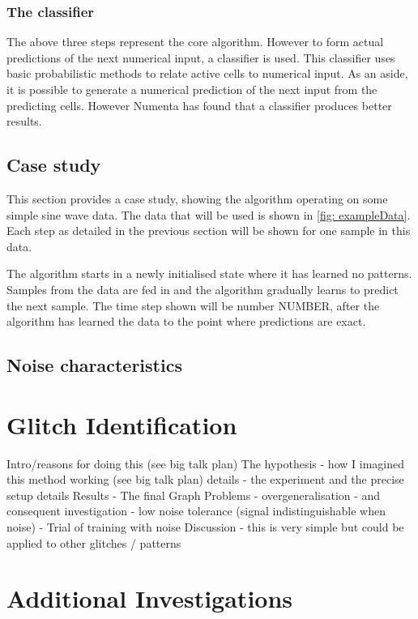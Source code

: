 \documentclass[a4paper]{jpconf}
\begin{document}
		\subsubsection{The classifier}
			The above three steps represent the core algorithm. However to form actual predictions of the next numerical input, a classifier is used. This classifier uses basic probabilistic methods to relate active cells to numerical input. As an aside, it is possible to generate a numerical prediction of the next input from the predicting cells. However Numenta has found that a classifier produces better results.
						 
	\subsection{Case study}
		This section provides a case study, showing the algorithm operating on some simple sine wave data. The data that will be used is shown in \ref{fig: exampleData}. Each step as detailed in the previous section will be shown for one sample in this data.
		
		The algorithm starts in a newly initialised state where it has learned no patterns. Samples from the data are fed in and the algorithm gradually learns to predict the next sample. The time step shown will be number NUMBER, after the algorithm has learned the data to the point where predictions are exact.
		
		
	
	\subsection{Noise characteristics}
\section{Glitch Identification}
Intro/reasons for doing this (see big talk plan)
The hypothesis - how I imagined this method working (see big talk plan)
details - the experiment and the precise setup details
Results - The final Graph
Problems
 - overgeneralisation - and consequent investigation
 - low noise tolerance (signal indistinguishable when noise)
 - Trial of training with noise
Discussion - this is very simple but could be applied to other glitches / patterns
\section{Additional Investigations}
\end{document}
